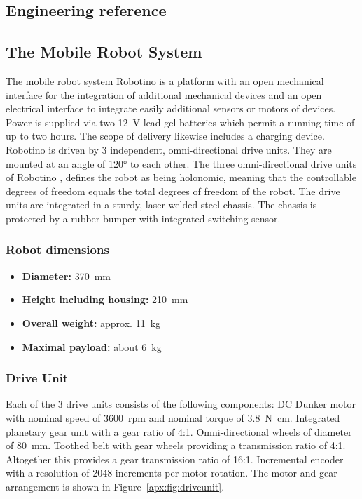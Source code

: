 \documentclass[12pt,twoside]{article}
\begin{document}
\begin{appendix}
\newpage

\section{Engineering reference} \label{apx:sec:engref}
\subsection{The Mobile Robot System}
The mobile robot system Robotino is a platform with an open
mechanical interface for the integration of additional mechanical
devices and an open electrical interface to integrate easily
additional sensors or motors of devices. Power is supplied via two
\SI{12}{\volt} lead gel batteries which permit a running time of up to
two hours.  The scope of delivery likewise includes a charging
device. Robotino is driven by 3 independent, omni-directional drive
units. They are mounted at an angle of \ang{120} to each other. The
three omni-directional drive units of Robotino , defines the robot as
being holonomic, meaning that the controllable degrees of freedom
equals the total degrees of freedom of the robot. The drive units are
integrated in a sturdy, laser welded steel chassis. The chassis is
protected by a rubber bumper with integrated switching sensor.

\subsubsection{Robot dimensions}\label{apx:sec:robot}
\begin{itemize}
	\item[] \textbf{Diameter:} \SI{370}{\milli\metre}
	\item[] \textbf{Height including housing:} \SI{210}{\milli\metre}
 	\item[] \textbf{Overall weight:} approx. \SI{11}{\kilogram}
 	\item[] \textbf{Maximal payload:} about \SI{6}{\kilogram}
 \end{itemize}

\subsubsection{Drive Unit}
Each of the 3 drive units consists of the following components: DC
Dunker motor with nominal speed of \SI{3600}{rpm} and nominal torque
of \SI{3.8}{\newton\centi\metre}. Integrated planetary gear unit with
a gear ratio of 4:1. Omni-directional wheels of diameter of
\SI{80}{\milli\metre}. Toothed belt with gear wheels providing a
transmission ratio of 4:1.
%
Altogether this provides a gear transmission ratio of
16:1. Incremental encoder with a resolution of 2048 increments per
motor rotation.
%
The motor and gear arrangement is shown in
Figure~\ref{apx:fig:driveunit}.


\end{appendix}
\end{document}
